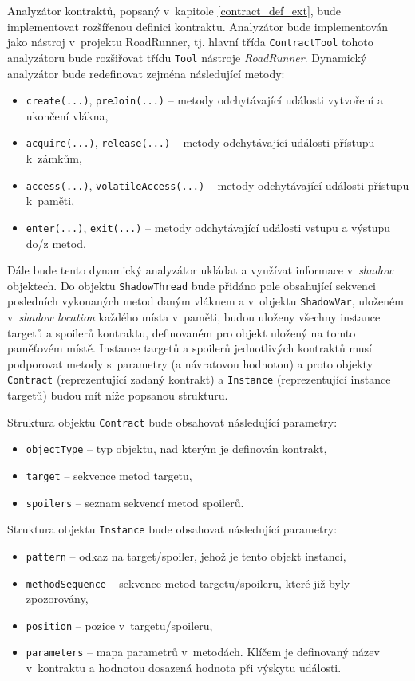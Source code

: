 Analyzátor kontraktů, popsaný v~kapitole \ref{contract_def_ext}, bude implementovat rozšířenou definici kontraktu. Analyzátor bude implementován jako nástroj v~projektu RoadRunner, tj. hlavní třída \texttt{ContractTool} tohoto analyzátoru bude rozšiřovat třídu \texttt{Tool} nástroje \textit{RoadRunner}. Dynamický analyzátor bude redefinovat zejména následující metody:
\begin{itemize}
\item \texttt{create(...)}, \texttt{preJoin(...)} -- metody odchytávající události vytvoření a ukončení vlákna,
\item \texttt{acquire(...)}, \texttt{release(...)} -- metody odchytávající události přístupu k~zámkům,
\item \texttt{access(...)}, \texttt{volatileAccess(...)} -- metody odchytávající události přístupu k~paměti, 
\item \texttt{enter(...)}, \texttt{exit(...)} -- metody odchytávající události vstupu a výstupu do/z metod.
\end{itemize} 

Dále bude tento dynamický analyzátor ukládat a využívat informace v~\textit{shadow} objektech. Do objektu \texttt{ShadowThread} bude přidáno pole obsahující sekvenci posledních vykonaných metod daným vláknem a v~objektu \texttt{ShadowVar}, uloženém v~\textit{shadow location} každého místa v~paměti, budou uloženy všechny instance targetů a spoilerů kontraktu, definovaném pro objekt uložený na tomto paměťovém místě. Instance targetů a spoilerů jednotlivých kontraktů musí podporovat metody s~parametry (a návratovou hodnotou) a proto objekty \texttt{Contract} (reprezentující zadaný kontrakt) a \texttt{Instance} (reprezentující instance targetů) budou mít níže popsanou strukturu.

Struktura objektu \texttt{Contract} bude obsahovat následující parametry:
\begin{itemize}
\item \texttt{objectType} -- typ objektu, nad kterým je definován kontrakt,
\item \texttt{target} -- sekvence metod targetu,
\item \texttt{spoilers} -- seznam sekvencí metod spoilerů.
\end{itemize}

Struktura objektu \texttt{Instance} bude obsahovat následující parametry:
\begin{itemize}
\item \texttt{pattern} -- odkaz na target/spoiler, jehož je tento objekt instancí,
\item \texttt{methodSequence} -- sekvence metod targetu/spoileru, které již byly zpozorovány,
\item \texttt{position} -- pozice v~targetu/spoileru,
\item \texttt{parameters} -- mapa parametrů v~metodách. Klíčem je definovaný název v~kontraktu a hodnotou dosazená hodnota při výskytu události.
\end{itemize}

